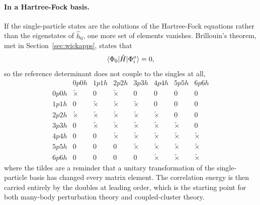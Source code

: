\paragraph{In a Hartree-Fock basis.}
If the single-particle states are the solutions of the Hartree-Fock equations
rather than the eigenstates of $\hat{h}_0$, one more set of elements
vanishes.  Brillouin's theorem, met in Section~\ref{sec:wickapps}, states that
\begin{equation}
  \langle \Phi_0 | \hat{H} | \Phi_i^a \rangle = 0,
  \label{eq:5-brillouin}
\end{equation}
so the reference determinant does not couple to the singles at all,
\begin{equation}
  \begin{array}{c|ccccccc}
     & 0p0h & 1p1h & 2p2h & 3p3h & 4p4h & 5p5h & 6p6h\\
    \hline
    0p0h & \tilde{\times} & 0 & \tilde{\times} & 0 & 0 & 0 & 0\\
    1p1h & 0 & \tilde{\times} & \tilde{\times} & \tilde{\times} & 0 & 0 & 0\\
    2p2h & \tilde{\times} & \tilde{\times} & \tilde{\times} & \tilde{\times}
         & \tilde{\times} & 0 & 0\\
    3p3h & 0 & \tilde{\times} & \tilde{\times} & \tilde{\times}
         & \tilde{\times} & \tilde{\times} & 0\\
    4p4h & 0 & 0 & \tilde{\times} & \tilde{\times} & \tilde{\times}
         & \tilde{\times} & \tilde{\times}\\
    5p5h & 0 & 0 & 0 & \tilde{\times} & \tilde{\times} & \tilde{\times}
         & \tilde{\times}\\
    6p6h & 0 & 0 & 0 & 0 & \tilde{\times} & \tilde{\times} & \tilde{\times}
  \end{array}
  \label{eq:5-blockstructureHF}
\end{equation}
where the tildes are a reminder that a unitary transformation of the
single-particle basis has changed every matrix element.  The correlation
energy is then carried entirely by the doubles at leading order, which is the
starting point for both many-body perturbation theory and coupled-cluster
theory.

